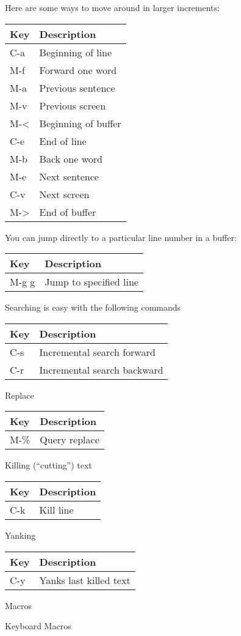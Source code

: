 Here are some ways to move around in larger increments:

\begin{longtable}[]{@{}ll@{}}
\toprule
Key & Description\tabularnewline
\midrule
\endhead
C-a & Beginning of line\tabularnewline
M-f & Forward one word\tabularnewline
M-a & Previous sentence\tabularnewline
M-v & Previous screen\tabularnewline
M-\textless{} & Beginning of buffer\tabularnewline
C-e & End of line\tabularnewline
M-b & Back one word\tabularnewline
M-e & Next sentence\tabularnewline
C-v & Next screen\tabularnewline
M-\textgreater{} & End of buffer\tabularnewline
\bottomrule
\end{longtable}

You can jump directly to a particular line number in a buffer:

\begin{longtable}[]{@{}ll@{}}
\toprule
Key & Description\tabularnewline
\midrule
\endhead
M-g g & Jump to specified line\tabularnewline
\bottomrule
\end{longtable}

Searching is easy with the following commands

\begin{longtable}[]{@{}ll@{}}
\toprule
Key & Description\tabularnewline
\midrule
\endhead
C-s & Incremental search forward\tabularnewline
C-r & Incremental search backward\tabularnewline
\bottomrule
\end{longtable}

Replace

\begin{longtable}[]{@{}ll@{}}
\toprule
Key & Description\tabularnewline
\midrule
\endhead
M-\% & Query replace\tabularnewline
\bottomrule
\end{longtable}

Killing (``cutting'') text

\begin{longtable}[]{@{}ll@{}}
\toprule
Key & Description\tabularnewline
\midrule
\endhead
C-k & Kill line\tabularnewline
\bottomrule
\end{longtable}

Yanking

\begin{longtable}[]{@{}ll@{}}
\toprule
Key & Description\tabularnewline
\midrule
\endhead
C-y & Yanks last killed text\tabularnewline
\bottomrule
\end{longtable}

Macros

Keyboard Macros


